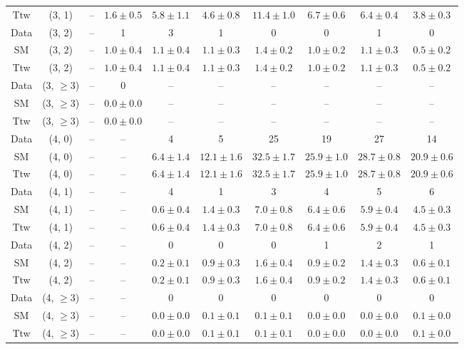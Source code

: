 \begin{table}[h!]
{\begin{tabular}{cccccccccc}
	Ttw & (3, 1) & -- & $1.6\pm 0.5$ & $5.8\pm 1.1$ & $4.6\pm 0.8$ & $11.4\pm 1.0$ & $6.7\pm 0.6$ & $6.4\pm 0.4$ & $3.8\pm 0.3$ \\[0.5ex] 
	Data & (3, 2) & -- & 1 & 3 & 1 & 0 & 0 & 1 & 0 \\[0.5ex] 
	SM & (3, 2) & -- & $1.0\pm 0.4$ & $1.1\pm 0.4$ & $1.1\pm 0.3$ & $1.4\pm 0.2$ & $1.0\pm 0.2$ & $1.1\pm 0.3$ & $0.5\pm 0.2$ \\[0.5ex] 
	Ttw & (3, 2) & -- & $1.0\pm 0.4$ & $1.1\pm 0.4$ & $1.1\pm 0.3$ & $1.4\pm 0.2$ & $1.0\pm 0.2$ & $1.1\pm 0.3$ & $0.5\pm 0.2$ \\[0.5ex] 
	Data & (3, $\ge3$) & -- & 0 & -- & -- & -- & -- & -- & -- \\[0.5ex] 
	SM & (3, $\ge3$) & -- & $0.0\pm 0.0$ & -- & -- & -- & -- & -- & -- \\[0.5ex] 
	Ttw & (3, $\ge3$) & -- & $0.0\pm 0.0$ & -- & -- & -- & -- & -- & -- \\[0.5ex] 
	Data & (4, 0) & -- & -- & 4 & 5 & 25 & 19 & 27 & 14 \\[0.5ex] 
	SM & (4, 0) & -- & -- & $6.4\pm 1.4$ & $12.1\pm 1.6$ & $32.5\pm 1.7$ & $25.9\pm 1.0$ & $28.7\pm 0.8$ & $20.9\pm 0.6$ \\[0.5ex] 
	Ttw & (4, 0) & -- & -- & $6.4\pm 1.4$ & $12.1\pm 1.6$ & $32.5\pm 1.7$ & $25.9\pm 1.0$ & $28.7\pm 0.8$ & $20.9\pm 0.6$ \\[0.5ex] 
	Data & (4, 1) & -- & -- & 4 & 1 & 3 & 4 & 5 & 6 \\[0.5ex] 
	SM & (4, 1) & -- & -- & $0.6\pm 0.4$ & $1.4\pm 0.3$ & $7.0\pm 0.8$ & $6.4\pm 0.6$ & $5.9\pm 0.4$ & $4.5\pm 0.3$ \\[0.5ex] 
	Ttw & (4, 1) & -- & -- & $0.6\pm 0.4$ & $1.4\pm 0.3$ & $7.0\pm 0.8$ & $6.4\pm 0.6$ & $5.9\pm 0.4$ & $4.5\pm 0.3$ \\[0.5ex] 
	Data & (4, 2) & -- & -- & 0 & 0 & 0 & 1 & 2 & 1 \\[0.5ex] 
	SM & (4, 2) & -- & -- & $0.2\pm 0.1$ & $0.9\pm 0.3$ & $1.6\pm 0.4$ & $0.9\pm 0.2$ & $1.4\pm 0.3$ & $0.6\pm 0.1$ \\[0.5ex] 
	Ttw & (4, 2) & -- & -- & $0.2\pm 0.1$ & $0.9\pm 0.3$ & $1.6\pm 0.4$ & $0.9\pm 0.2$ & $1.4\pm 0.3$ & $0.6\pm 0.1$ \\[0.5ex] 
	Data & (4, $\ge3$) & -- & -- & 0 & 0 & 0 & 0 & 0 & 0 \\[0.5ex] 
	SM & (4, $\ge3$) & -- & -- & $0.0\pm 0.0$ & $0.1\pm 0.1$ & $0.1\pm 0.1$ & $0.0\pm 0.0$ & $0.0\pm 0.0$ & $0.1\pm 0.0$ \\[0.5ex] 
	Ttw & (4, $\ge3$) & -- & -- & $0.0\pm 0.0$ & $0.1\pm 0.1$ & $0.1\pm 0.1$ & $0.0\pm 0.0$ & $0.0\pm 0.0$ & $0.1\pm 0.0$ \\[0.5ex] 

\end{tabular}}
\end{table}
